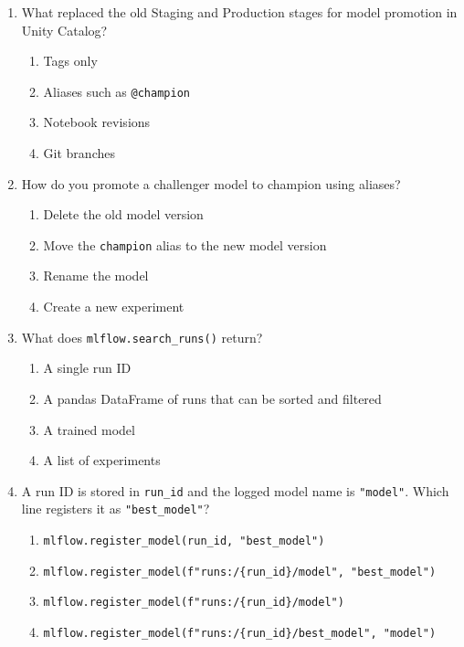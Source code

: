 \documentclass[11pt]{article}
\begin{document}
\begin{enumerate}[leftmargin=*, label=\textbf{Q\arabic*.}]
		\item What replaced the old Staging and Production stages for model promotion in Unity Catalog?
		\begin{enumerate}[label=(\alph*)]
			\item Tags only
			\item Aliases such as \texttt{@champion}
			\item Notebook revisions
			\item Git branches
		\end{enumerate}
		
		\item How do you promote a challenger model to champion using aliases?
		\begin{enumerate}[label=(\alph*)]
			\item Delete the old model version
			\item Move the \texttt{champion} alias to the new model version
			\item Rename the model
			\item Create a new experiment
		\end{enumerate}
		
		\item What does \texttt{mlflow.search\_runs()} return?
		\begin{enumerate}[label=(\alph*)]
			\item A single run ID
			\item A pandas DataFrame of runs that can be sorted and filtered
			\item A trained model
			\item A list of experiments
		\end{enumerate}
		
		\item A run ID is stored in \texttt{run\_id} and the logged model name is \texttt{"model"}. Which line registers it as \texttt{"best\_model"}?
		\begin{enumerate}[label=(\alph*)]
			\item \texttt{mlflow.register\_model(run\_id, "best\_model")}
			\item \texttt{mlflow.register\_model(f"runs:/\{run\_id\}/model", "best\_model")}
			\item \texttt{mlflow.register\_model(f"runs:/\{run\_id\}/model")}
			\item \texttt{mlflow.register\_model(f"runs:/\{run\_id\}/best\_model", "model")}
		\end{enumerate}
		

\end{enumerate}
\end{document}
